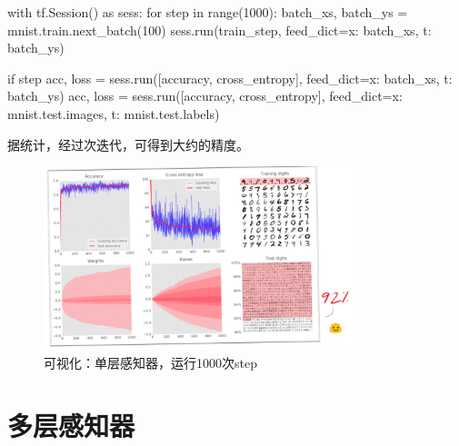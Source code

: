 \begin{content}
\begin{leftbar}
\begin{python}
with tf.Session() as sess:
  for step in range(1000):
    batch_xs, batch_ys = mnist.train.next_batch(100)        
    sess.run(train_step, feed_dict={x: batch_xs, t: batch_ys})
    
    if step %
      acc, loss = sess.run([accuracy, cross_entropy], 
        feed_dict={x: batch_xs, t: batch_ys})
      acc, loss = sess.run([accuracy, cross_entropy], 
        feed_dict={x: mnist.test.images, t: mnist.test.labels}) 
\end{python}
\end{leftbar}

据统计，经过次迭代，可得到大约的精度。

\begin{figure}[H]
\centering
\includegraphics[width=0.8\textwidth]{figures/mnist-slp-accuracy.png}
\caption{可视化：单层感知器，运行1000次step}
 \label{fig:mnist-slp-accuracy}
\end{figure}

\end{content}

\section{多层感知器}

